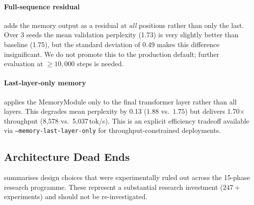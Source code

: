 \documentclass{article}
\begin{document}
\paragraph{Full-sequence residual} adds the memory output as a residual at \emph{all}
positions rather than only the last.  Over 3 seeds the mean validation perplexity
(1.73) is very slightly better than baseline (1.75), but the standard deviation of 0.49
makes this difference insignificant.  We do not promote this to the production default;
further evaluation at $\geq 10{,}000$ steps is needed.

\paragraph{Last-layer-only memory} applies the MemoryModule only to the final
transformer layer rather than all layers.  This degrades mean perplexity by 0.13
($1.88$ vs.\ $1.75$) but delivers 1.70$\times$ throughput (8{,}578 vs.\ 5{,}037\,tok/s).
This is an explicit efficiency tradeoff available via \texttt{--memory-last-layer-only}
for throughput-constrained deployments.

\subsection{Architecture Dead Ends}

 summarises design choices that were experimentally ruled out across
the 15-phase research programme.  These represent a substantial research investment
($247+$ experiments) and should not be re-investigated.
\end{document}
